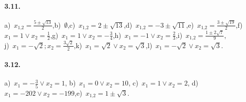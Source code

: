 

\paragraph{3.11.} a)~$x_{1\text{,}2} = \frac{5 \pm \sqrt{13}}{2}$,\quad b)~$\emptyset$,\quad c)~$x_{1\text{,}2} = 2 \pm \sqrt{13}$,\quad d)~$x_{1\text{,}2} =-3 \pm \sqrt{11}$,\quad e)~$x_{1\text{,}2} = \frac{3 \pm \sqrt{19}}{2}$,\quad f)~$x_{1} = 1 \vee x_{2} = \frac{1}{2}$,\quad g)~$x_{1} = 1 \vee x_{2} =-\frac{3}{4}$,\quad h)~$x_{1} =-1 \vee x_{2} = \frac{2}{3}$,\quad i)~$x_{1\text{,}2} = \frac{1 \pm 2 \sqrt{7}}{9}$,\protect\\
j)~$x_{1} =-\sqrt{2};x_{2} = \frac{3 \sqrt{2}}{2}$,\quad k)~$x_{1} = \sqrt{2} \vee x_{2} = \sqrt{3}$,\quad l)~$x_{1} =-\sqrt{2} \vee x_{2} = \sqrt{3}$.



\paragraph{3.12.} a)~$x_{1} =-\frac{3}{5} \vee x_{2} = 1$,\; b)~$x_{1} = 0 \vee x_{2} = 10$,\; c)~$x_{1} = 1 \vee x_{2} = 2$,\; d)~$x_{1} =-202 \vee x_{2} =-199$,\quad e)~$x_{1\text{,}2} = 1 \pm \sqrt{3}$.

